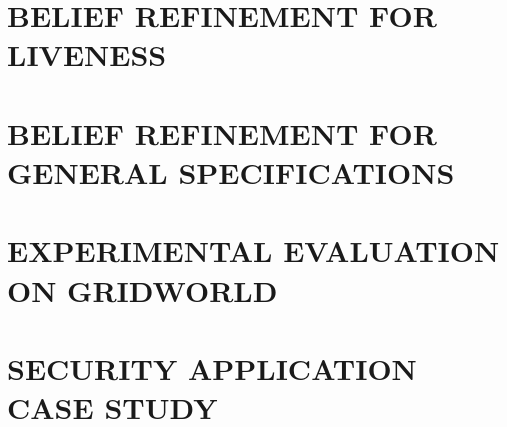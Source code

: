\section{BELIEF REFINEMENT FOR LIVENESS}%
%
%
%
%
\section{BELIEF REFINEMENT FOR GENERAL SPECIFICATIONS}%
%
%
%
%
\section{EXPERIMENTAL EVALUATION ON GRIDWORLD}\label{sec:experiments}

%
%
\section{SECURITY APPLICATION CASE STUDY}
%


%
%
%
%

